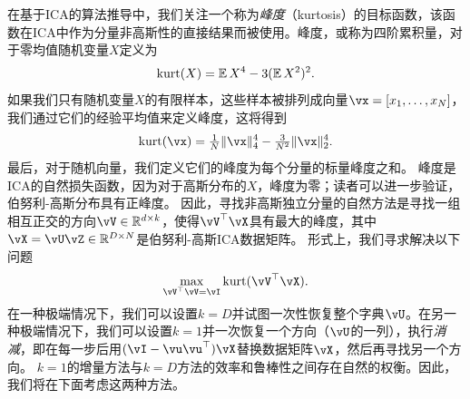 \documentclass[../../book-main_zh.tex]{subfiles}
\begin{document}
在基于ICA的算法推导中，我们关注一个称为\textit{峰度}（kurtosis）的目标函数，该函数在ICA中作为分量非高斯性的直接结果而被使用。峰度，或称为四阶累积量，对于零均值随机变量$X$定义为
\begin{equation}\label{eq:kurtosis}
\mathop{\mathrm{kurt}}(X) = \operatorname{\mathbb{E}}{X^4} - 3 (\operatorname{\mathbb{E}}{X^2})^2.
\end{equation}
如果我们只有随机变量$X$的有限样本，这些样本被排列成向量$\vx = [x_1, \dots, x_N]$，我们通过它们的经验平均值来定义峰度，这将得到
\begin{equation}\label{eq:kurtosis-vector}
\kurt(\vx) = \tfrac{1}{N} \norm{\vx}_4^4 - \tfrac{3}{N^2} \norm{\vx}_2^4.
\end{equation}
最后，对于随机向量，我们定义它们的峰度为每个分量的标量峰度之和。
峰度是ICA的自然损失函数，因为对于高斯分布的$X$，峰度为零；读者可以进一步验证，伯努利-高斯分布具有正峰度。
因此，寻找非高斯独立分量的自然方法是寻找一组相互正交的方向$\vV \in \R^{d \times k}$，使得$\vV^\top \vX$具有最大的峰度，其中$\vX = \vU \vZ \in \R^{D \times N}$是伯努利-高斯ICA数据矩阵。
形式上，我们寻求解决以下问题
\begin{equation}
    \max_{\vV^\top \vV = \vI} \kurt(\vV^\top \vX).
\end{equation}
在一种极端情况下，我们可以设置$k = D$并试图一次性恢复整个字典$\vU$。在另一种极端情况下，我们可以设置$k=1$并一次恢复一个方向（$\vU$的一列），执行\textit{消减}，即在每一步后用$(\vI - \vu\vu^\top) \vX$替换数据矩阵$\vX$，然后再寻找另一个方向。
$k=1$的增量方法与$k=D$方法的效率和鲁棒性之间存在自然的权衡。因此，我们将在下面考虑这两种方法。
\end{document}
